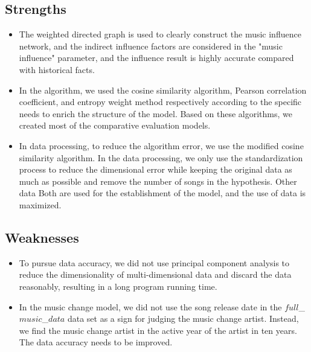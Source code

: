 \documentclass[12pt]{article}  %
\begin{document}
\subsection{Strengths}
\begin{itemize}
    \item The weighted directed graph is used to clearly construct the music influence network, and the indirect influence factors are considered in the "music influence" parameter, and the influence result is highly accurate compared with historical facts. 
    \item In the algorithm, we used the cosine similarity algorithm, Pearson correlation coefficient, and entropy weight method respectively according to the specific needs to enrich the structure of the model. Based on these algorithms, we created most of the comparative evaluation models.
    \item In data processing, to reduce the algorithm error, we use the modified cosine similarity algorithm. In the data processing, we only use the standardization process to reduce the dimensional error while keeping the original data as much as possible and remove the number of songs in the hypothesis. Other data Both are used for the establishment of the model, and the use of data is maximized. 
\end{itemize}

\subsection{Weaknesses}
\begin{itemize}
    \item To pursue data accuracy, we did not use principal component analysis to reduce the dimensionality of multi-dimensional data and discard the data reasonably, resulting in a long program running time. 
    \item In the music change model, we did not use the song release date in the $full$\_$music$\_$data$ data set as a sign for judging the music change artist. Instead, we find the music change artist in the active year of the artist in ten years. The data accuracy needs to be improved.
 \end{itemize}
\end{document}
